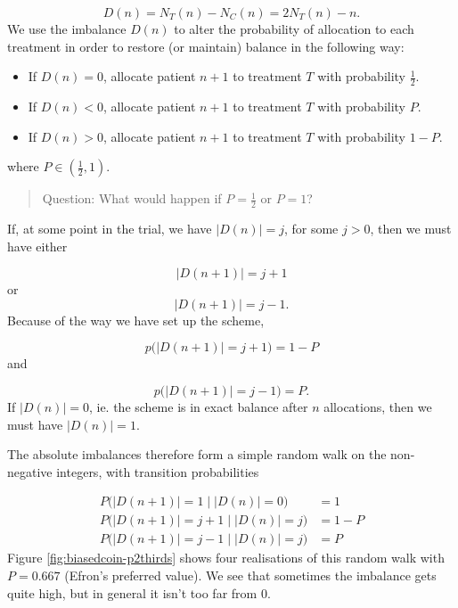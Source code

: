 \documentclass[
  openany]{book}
\providecommand{\tightlist}{%
  \setlength{\itemsep}{0pt}\setlength{\parskip}{0pt}}
\theoremstyle{definition}
\theoremstyle{definition}
\theoremstyle{definition}
\theoremstyle{definition}
\theoremstyle{remark}
\begin{document}
\[ D\left(n\right) = N_T\left(n\right) - N_C\left(n\right) = 2N_T\left(n\right) - n.\]
We use the imbalance \(D\left(n\right)\) to alter the probability of allocation to each treatment in order to restore (or maintain) balance in the following way:

\begin{itemize}
\tightlist
\item
  If \(D\left(n\right)=0\), allocate patient \(n+1\) to treatment \(T\) with probability \(\frac{1}{2}\).
\item
  If \(D\left(n\right)<0\), allocate patient \(n+1\) to treatment \(T\) with probability \(P\).
\item
  If \(D\left(n\right)>0\), allocate patient \(n+1\) to treatment \(T\) with probability \(1-P\).
\end{itemize}

where \(P\in\left(\frac{1}{2}, 1\right)\).

\begin{quote}
Question: What would happen if \(P=\frac{1}{2}\) or \(P=1\)?
\end{quote}

If, at some point in the trial, we have \(\lvert D\left(n\right)\rvert = j\), for some \(j>0\), then we must have either

\[ \lvert D\left(n+1\right)\rvert = j+1 \]
or
\[ \lvert D\left(n+1\right)\rvert = j-1 .\]
Because of the way we have set up the scheme,

\[ p\big(\lvert D\left(n+1\right)\rvert = j+1\big) = 1-P \]
and

\[ p\big(\lvert D\left(n+1\right)\rvert = j-1\big) = P.\]
If \(\lvert D\left(n\right) \rvert = 0\), ie. the scheme is in exact balance after \(n\) allocations, then we must have \(\lvert D\left(n\right)\rvert = 1\).

The absolute imbalances therefore form a simple random walk on the non-negative integers, with transition probabilities

\[
  \begin{aligned}
P\bigg(\lvert D\left(n+1\right) \rvert = 1 \; \bigg| \;\lvert D\left(n\right)\rvert=0\bigg)& = 1\\
P\bigg(\lvert D\left(n+1\right) \rvert = j+ 1 \; \bigg| \; \lvert D\left(n\right)\rvert=j\bigg)& = 1 - P\\
P\bigg(\lvert D\left(n+1\right) \rvert = j-1 \; \bigg| \; \lvert D\left(n\right)\rvert=j\bigg)& = P
\end{aligned}
\]
Figure \ref{fig:biasedcoin-p2thirds} shows four realisations of this random walk with \(P=0.667\) (Efron's preferred value). We see that sometimes the imbalance gets quite high, but in general it isn't too far from 0.
\end{document}

